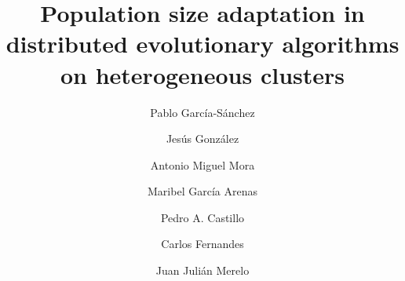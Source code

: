 \documentclass[final,1p,times]{elsarticle}
\begin{document}
\begin{frontmatter}



\title{Population size adaptation in distributed evolutionary algorithms on heterogeneous clusters}


\author[ugr]{Pablo Garc\'ia-S\'anchez}
\author[ugr]{Jes\'us Gonz\'alez}
\author[ugr]{Antonio Miguel Mora}
\author[ugr]{Maribel Garc\'ia Arenas}
\author[ugr]{Pedro A. Castillo}
\author[laseeb]{Carlos Fernandes}
\author[ugr]{Juan Juli\'an Merelo}


\address[ugr]{Department of Computer Architecture and Computer Technology and CITIC-UGR, University of Granada, Granada, Spain. Tel: +34958241778. Fax: +34958248993}
\address[laseeb]{LaSEEB-ISR-IST, Technical University of Lisbon (IST), Lisbon, Portugal}%



\end{frontmatter}
\end{document}
